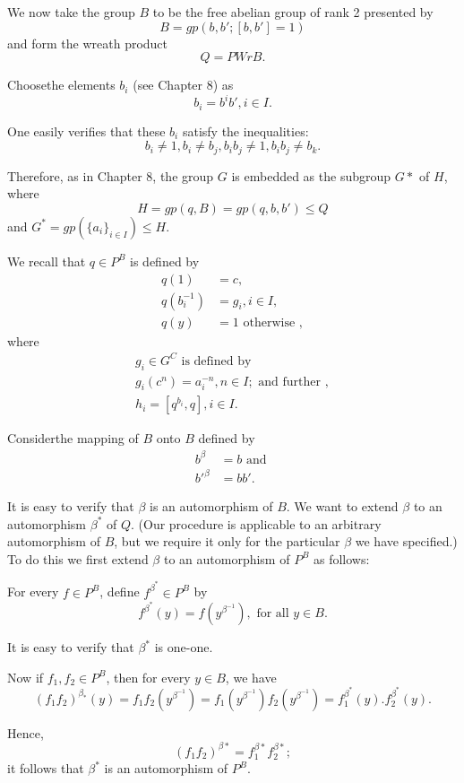 We now take the group $B$ to be the free abelian group of rank 2
presented by  
$$
B= gp (b, b' ; [b, b']=1)
$$
and form the wreath product 
$$
Q = PW r B.
$$

Choose\pageoriginale the elements $b_i$ (see Chapter 8) as 
$$
b_i = b^i b', i \in  I.
$$

One easily verifies that these $b_i$ satisfy the inequalities:
$$
b_i \neq 1, b_i \neq b_j, b_i b_j \neq 1, b_i b_j \neq b_k.
$$

Therefore, as in Chapter 8, the group $G$ is embedded as the subgroup
$G*$ of $H$, where  
$$
H = gp(q,B) = gp (q,b,b') \leq Q
$$
and $G^* = gp(\big\{ a_i \big\}_{i \in  I}) \leq H$.

We recall that $q \in  P^B$ is defined by 
\begin{align*}
  q(1) & =c,\\
  q(b^{-1}_i) & = g_i, i \in  I,\\
  q(y) & = 1 \text{ otherwise },
\end{align*}
where 
\begin{gather*}
  g_i \in  G^C \text{ is defined by }\\
  g_i(c^n) = a^{-n}_i,  n \in  I; \text{ and further },\\
  h_i = [q^{b_i}, q], i \in  I.
\end{gather*}

Consider\pageoriginale the mapping of $B$ onto $B$ defined by 
\begin{align*}
  b^{\beta}& = b \text{ and }\\
  b'^{\beta} & = bb'.
\end{align*}

It is easy to verify that $\beta$ is an automorphism of $B$. We want
to extend  $\beta$ to an automorphism  $\beta^*$ of $Q$. (Our procedure
is applicable to an arbitrary automorphism of $B$, but we require it
only for the particular  $\beta$ we have specified.) To do this we
first extend  $\beta$ to an automorphism of $P^B$ as follows: 

For every $f \in  P^B$, define $f^{\beta^*} \in  P^B$ by 
$$
f^{\beta^*} (y) = f(y^{\beta^{-1}}),  \text{ for all } y \in  B.
$$

It is easy to verify that $\beta^*$ is one-one.

Now if $f_1, f_2 \in  P^B$, then for every $y \in  B$, we have 
$$
(f_1f_2)^{\beta_*}(y) = f_1 f_2 (y^{\beta^{-1}}) = f_1(y^{\beta^{-1}})
f_2(y^{\beta^{-1}}) =  f^{\beta^*}_1 (y).  f_2^{\beta^*}(y). 
$$

Hence, 
$$
(f_1 f_2)^{\beta*} = f^{\beta*}_1 f^{\beta*}_2 ;
$$
it follows that ${\beta^*}$ is an automorphism of $P^B$. 

